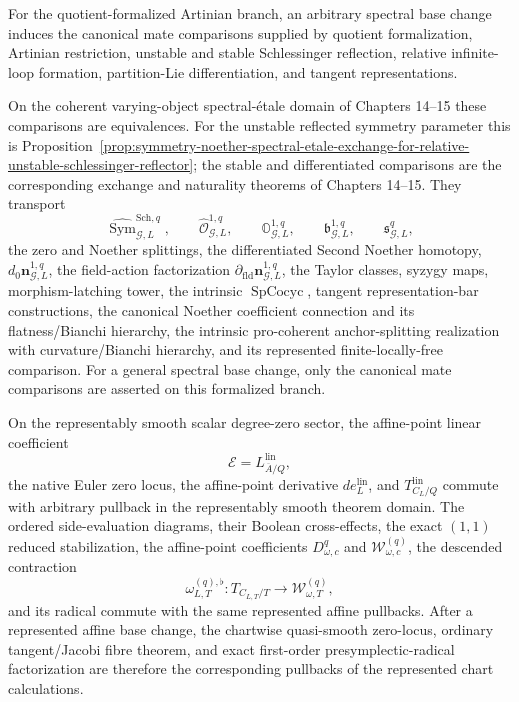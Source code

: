 \begin{proposition}
\label{prop:symmetry-noether-base-change-strength-of-the-formalized-algebraic-branch}
For the quotient-formalized Artinian branch, an arbitrary spectral base change
induces the canonical mate comparisons supplied by quotient formalization,
Artinian restriction, unstable and stable Schlessinger reflection, relative
infinite-loop formation, partition-Lie differentiation, and tangent
representations.

On the coherent varying-object spectral-\'etale domain of Chapters 14--15 these
comparisons are equivalences.  For the unstable reflected symmetry parameter this is
Proposition~\ref{prop:symmetry-noether-spectral-etale-exchange-for-relative-unstable-schlessinger-reflector};
the stable and differentiated comparisons are the corresponding exchange and
naturality theorems of Chapters 14--15.  They transport
\[
\widehat{\operatorname{Sym}}_{\mathcal G,L}^{\mathrm{Sch},q},\qquad
\widehat{\mathcal O}_{\mathcal G,L}^{1,q},\qquad
\mathbb O_{\mathcal G,L}^{1,q},\qquad
\mathfrak b_{\mathcal G,L}^{1,q},\qquad
\mathfrak s_{\mathcal G,L}^{q},
\]
the zero and Noether splittings, the differentiated Second Noether homotopy,
$d_0\mathbf n_{\mathcal G,L}^{1,q}$, the field-action factorization
$\partial_{\mathrm{fld}}\mathbf n_{\mathcal G,L}^{1,q}$, the Taylor classes,
syzygy maps, morphism-latching tower, the intrinsic $\operatorname{SpCocyc}$,
tangent representation-bar constructions, the canonical Noether coefficient
connection and its flatness/Bianchi hierarchy, the intrinsic pro-coherent
anchor-splitting realization with curvature/Bianchi hierarchy, and its represented
finite-locally-free comparison.  For a general spectral base change, only the
canonical mate comparisons are asserted on this formalized branch.
\end{proposition}

\begin{proposition}
\label{prop:symmetry-noether-base-change-of-the-affine-point-critical-linearization}
On the representably smooth scalar degree-zero sector, the affine-point linear
coefficient
\[
\mathcal E=L_{\overline A/Q}^{\mathrm{lin}},
\]
the native Euler zero locus, the affine-point derivative $de_L^{\mathrm{lin}}$, and
$T_{C_L/Q}^{\mathrm{lin}}$ commute with arbitrary pullback in the representably
smooth theorem domain.  The ordered side-evaluation diagrams, their Boolean
cross-effects, the exact $(1,1)$ reduced stabilization, the affine-point coefficients
$D_{\omega,c}^{q}$ and $\mathcal W_{\omega,c}^{(q)}$, the descended contraction
\[
\omega_{L,T}^{(q),\flat}:
T_{C_{L,T}/T}\longrightarrow\mathcal W_{\omega,T}^{(q)},
\]
and its radical commute with the same represented affine pullbacks.  After a
represented affine base change, the chartwise quasi-smooth zero-locus, ordinary
tangent/Jacobi fibre theorem, and exact first-order presymplectic-radical
factorization are therefore the corresponding pullbacks of the represented chart
calculations.
\end{proposition}
